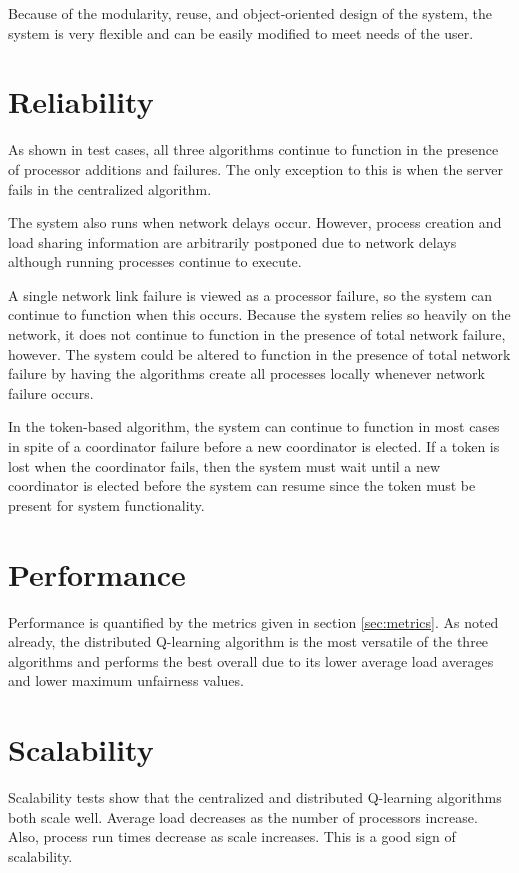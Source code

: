 \documentclass{report}
\begin{document}
Because of the modularity, reuse, and object-oriented design of the system,
the system is very flexible and can be easily modified to meet needs of the
user. 

\section{Reliability}

As shown in test cases, all three algorithms continue to function in the
presence of processor additions and failures.  The only exception to this is
when the server fails in the centralized algorithm.

The system also runs when network delays occur.  However, process creation
and load sharing information are arbitrarily postponed due to network delays
although running processes continue to execute.

A single network link failure is viewed as a processor failure, so the
system can continue to function when this occurs.  Because the system relies
so heavily on the network, it does not continue to function in the presence
of total network failure, however.  The system could be altered to function
in the presence of total network failure by having the algorithms create all
processes locally whenever network failure occurs.

In the token-based algorithm, the system can continue to function in most
cases in spite of a coordinator failure before a new coordinator is elected.
If a token is lost when the coordinator fails, then the system must wait
until a new coordinator is elected before the system can resume since the
token must be present for system functionality.


\section{Performance}

Performance is quantified by the metrics given in section \ref{sec:metrics}.
As noted already, the distributed Q-learning algorithm is the most versatile
of the three algorithms and performs the best overall due to its lower
average load averages and lower maximum unfairness values.


\section{Scalability}
\label{conclusion:token}

Scalability tests show that the centralized and distributed Q-learning
algorithms both scale well.  Average load decreases as the number of
processors increase.   Also, process run times decrease as scale increases.
This is a good sign of scalability.
\end{document}
